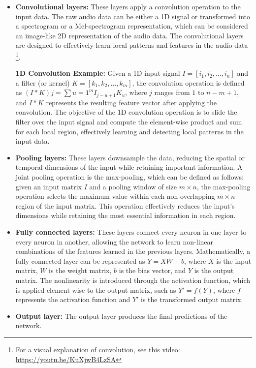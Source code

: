\begin{itemize}

\item \textbf{Convolutional layers:} These layers apply a convolution operation to the input data. The raw audio data can be either a 1D signal or transformed into a spectrogram or a Mel-spectrogram representation, which can be considered an image-like 2D representation of the audio data. The convolutional layers are designed to effectively learn local patterns and features in the audio data \footnote{For a visual explanation of convolution, see this video: \url{https://youtu.be/KuXjwB4LzSA}}.

\textbf{1D Convolution Example:} Given a 1D input signal $I = [i_1, i_2, ..., i_n]$ and a filter (or kernel) $K = [k_1, k_2, ..., k_m]$, the convolution operation is defined as $(I * K)j = \sum{u=1}^{m} I_{j-u+1} K_u$, where $j$ ranges from $1$ to $n-m+1$, and $I * K$ represents the resulting feature vector after applying the convolution. The objective of the 1D convolution operation is to slide the filter over the input signal and compute the element-wise product and sum for each local region, effectively learning and detecting local patterns in the input data.

\item \textbf{Pooling layers:} These layers downsample the data, reducing the spatial or temporal dimensions of the input while retaining important information. A joint pooling operation is the max-pooling, which can be defined as follows: given an input matrix $I$ and a pooling window of size $m \times n$, the max-pooling operation selects the maximum value within each non-overlapping $m \times n$ region of the input matrix. This operation effectively reduces the input's dimensions while retaining the most essential information in each region.
\vspace*{3mm}

\item \textbf{Fully connected layers:} These layers connect every neuron in one layer to every neuron in another, allowing the network to learn non-linear combinations of the features learned in the previous layers. Mathematically, a fully connected layer can be represented as $Y = XW + b$, where $X$ is the input matrix, $W$ is the weight matrix, $b$ is the bias vector, and $Y$ is the output matrix. The nonlinearity is introduced through the activation function, which is applied element-wise to the output matrix, such as $Y' = f(Y)$, where $f$ represents the activation function and $Y'$ is the transformed output matrix.
\vspace*{3mm}

\item \textbf{Output layer:} The output layer produces the final predictions of the network.

\end{itemize}

